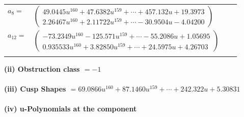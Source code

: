 \documentclass[1p]{elsarticle_modified}
\theoremstyle{definition}
\begin{document}
\begin{tabular}{m{7pt} m{180pt} m{7pt} m{180pt} }
\flushright $a_{8}=$&$\begin{pmatrix}49.0445 u^{160}+47.6382 u^{159}+\cdots+457.132 u+19.3973\\2.26467 u^{160}+2.11722 u^{159}+\cdots-30.9504 u-4.04200\end{pmatrix}$ \\
\flushright $a_{12}=$&$\begin{pmatrix}-73.2349 u^{160}-125.571 u^{159}+\cdots-55.2086 u+1.05695\\0.935533 u^{160}+3.82850 u^{159}+\cdots+24.5975 u+4.26703\end{pmatrix}$\\&\end{tabular}
\flushleft \textbf{(ii) Obstruction class $= -1$}\\~\\
\flushleft \textbf{(iii) Cusp Shapes $= 69.0866 u^{160}+87.1460 u^{159}+\cdots+242.322 u+5.30831$}\\~\\
\newpage\renewcommand{\arraystretch}{1}
\flushleft \textbf{(iv) u-Polynomials at the component}\newline \\
\end{document}
